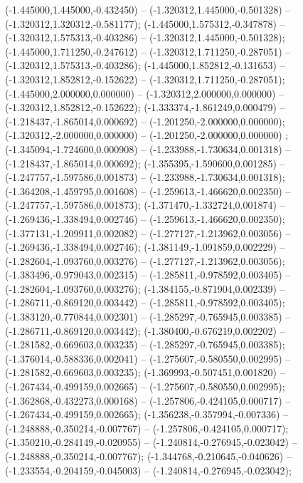 (-1.445000,1.445000,-0.432450) -- (-1.320312,1.445000,-0.501328) -- (-1.320312,1.320312,-0.581177);
 (-1.445000,1.575312,-0.347878) -- (-1.320312,1.575313,-0.403286) -- (-1.320312,1.445000,-0.501328);
 (-1.445000,1.711250,-0.247612) -- (-1.320312,1.711250,-0.287051) -- (-1.320312,1.575313,-0.403286);
 (-1.445000,1.852812,-0.131653) -- (-1.320312,1.852812,-0.152622) -- (-1.320312,1.711250,-0.287051);
 (-1.445000,2.000000,0.000000) -- (-1.320312,2.000000,0.000000) -- (-1.320312,1.852812,-0.152622);
 (-1.333374,-1.861249,0.000479) -- (-1.218437,-1.865014,0.000692) -- (-1.201250,-2.000000,0.000000);
 (-1.320312,-2.000000,0.000000) -- (-1.201250,-2.000000,0.000000) ;
 (-1.345094,-1.724600,0.000908) -- (-1.233988,-1.730634,0.001318) -- (-1.218437,-1.865014,0.000692);
 (-1.355395,-1.590600,0.001285) -- (-1.247757,-1.597586,0.001873) -- (-1.233988,-1.730634,0.001318);
 (-1.364208,-1.459795,0.001608) -- (-1.259613,-1.466620,0.002350) -- (-1.247757,-1.597586,0.001873);
 (-1.371470,-1.332724,0.001874) -- (-1.269436,-1.338494,0.002746) -- (-1.259613,-1.466620,0.002350);
 (-1.377131,-1.209911,0.002082) -- (-1.277127,-1.213962,0.003056) -- (-1.269436,-1.338494,0.002746);
 (-1.381149,-1.091859,0.002229) -- (-1.282604,-1.093760,0.003276) -- (-1.277127,-1.213962,0.003056);
 (-1.383496,-0.979043,0.002315) -- (-1.285811,-0.978592,0.003405) -- (-1.282604,-1.093760,0.003276);
 (-1.384155,-0.871904,0.002339) -- (-1.286711,-0.869120,0.003442) -- (-1.285811,-0.978592,0.003405);
 (-1.383120,-0.770844,0.002301) -- (-1.285297,-0.765945,0.003385) -- (-1.286711,-0.869120,0.003442);
 (-1.380400,-0.676219,0.002202) -- (-1.281582,-0.669603,0.003235) -- (-1.285297,-0.765945,0.003385);
 (-1.376014,-0.588336,0.002041) -- (-1.275607,-0.580550,0.002995) -- (-1.281582,-0.669603,0.003235);
 (-1.369993,-0.507451,0.001820) -- (-1.267434,-0.499159,0.002665) -- (-1.275607,-0.580550,0.002995);
 (-1.362868,-0.432273,0.000168) -- (-1.257806,-0.424105,0.000717) -- (-1.267434,-0.499159,0.002665);
 (-1.356238,-0.357994,-0.007336) -- (-1.248888,-0.350214,-0.007767) -- (-1.257806,-0.424105,0.000717);
 (-1.350210,-0.284149,-0.020955) -- (-1.240814,-0.276945,-0.023042) -- (-1.248888,-0.350214,-0.007767);
 (-1.344768,-0.210645,-0.040626) -- (-1.233554,-0.204159,-0.045003) -- (-1.240814,-0.276945,-0.023042);
